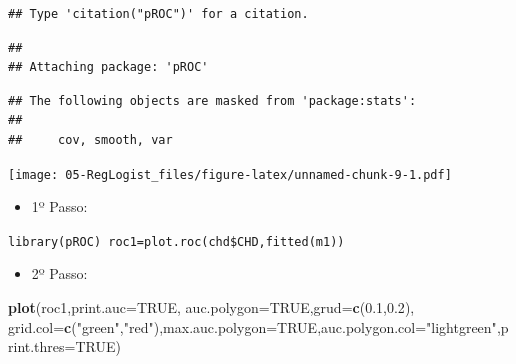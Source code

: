 \documentclass[12pt,brazil,]{book}
\newenvironment{Shaded}{\begin{snugshade}}{\end{snugshade}}
\newcommand{\DataTypeTok}[1]{\textcolor[rgb]{0.13,0.29,0.53}{#1}}
\newcommand{\FloatTok}[1]{\textcolor[rgb]{0.00,0.00,0.81}{#1}}
\newcommand{\KeywordTok}[1]{\textcolor[rgb]{0.13,0.29,0.53}{\textbf{#1}}}
\newcommand{\NormalTok}[1]{#1}
\newcommand{\OperatorTok}[1]{\textcolor[rgb]{0.81,0.36,0.00}{\textbf{#1}}}
\newcommand{\OtherTok}[1]{\textcolor[rgb]{0.56,0.35,0.01}{#1}}
\newcommand{\StringTok}[1]{\textcolor[rgb]{0.31,0.60,0.02}{#1}}
\providecommand{\tightlist}{%
  \setlength{\itemsep}{0pt}\setlength{\parskip}{0pt}}
\begin{document}
\begin{verbatim}
## Type 'citation("pROC")' for a citation.
\end{verbatim}

\begin{verbatim}
## 
## Attaching package: 'pROC'
\end{verbatim}

\begin{verbatim}
## The following objects are masked from 'package:stats':
## 
##     cov, smooth, var
\end{verbatim}

\begin{Shaded}
\end{Shaded}

\texttt{[image: 05-RegLogist\_files/figure-latex/unnamed-chunk-9-1.pdf]}

\begin{itemize}
\tightlist
\item
  1º Passo:
\end{itemize}

\texttt{library(pROC)\ roc1=plot.roc(chd\$CHD,fitted(m1))}

\begin{itemize}
\tightlist
\item
  2º Passo:
\end{itemize}

\begin{Shaded}
\begin{Highlighting}[]
\KeywordTok{plot}\NormalTok{(roc1,}\DataTypeTok{print.auc=}\OtherTok{TRUE}\NormalTok{, }\DataTypeTok{auc.polygon=}\OtherTok{TRUE}\NormalTok{,}\DataTypeTok{grud=}\KeywordTok{c}\NormalTok{(}\FloatTok{0.1}\NormalTok{,}\FloatTok{0.2}\NormalTok{),}
\DataTypeTok{grid.col=}\KeywordTok{c}\NormalTok{(}\StringTok{"green"}\NormalTok{,}\StringTok{"red"}\NormalTok{),}\DataTypeTok{max.auc.polygon=}\OtherTok{TRUE}\NormalTok{,}\DataTypeTok{auc.polygon.col=}\StringTok{"lightgreen"}\NormalTok{,}\DataTypeTok{print.thres=}\OtherTok{TRUE}\NormalTok{)}
\end{Highlighting}
\end{Shaded}
\end{document}
